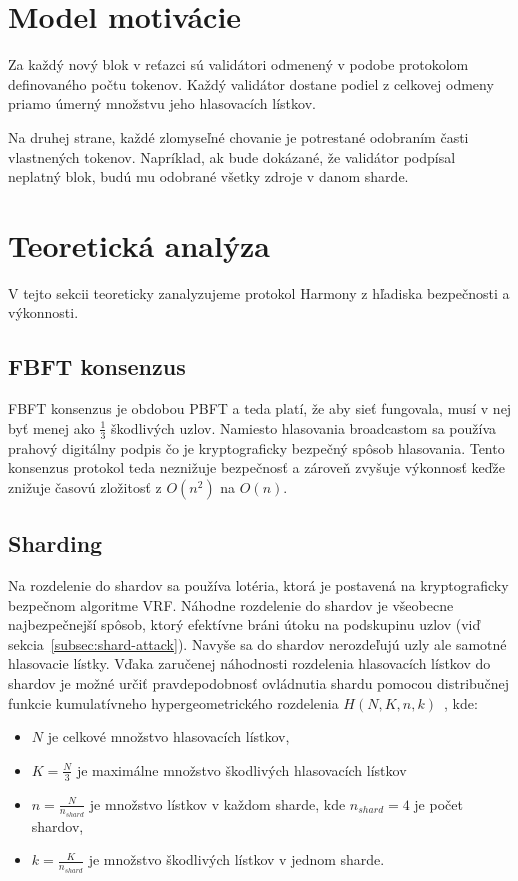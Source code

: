 \section{Model motivácie}

Za každý nový blok v reťazci sú validátori odmenený v podobe protokolom definovaného počtu tokenov. Každý validátor dostane podiel z celkovej odmeny priamo úmerný množstvu jeho hlasovacích lístkov.

Na druhej strane, každé zlomyseľné chovanie je potrestané odobraním časti vlastnených tokenov. Napríklad, ak bude dokázané, že validátor podpísal neplatný blok, budú mu odobrané všetky zdroje v danom sharde.

\section{Teoretická analýza}\label{sec:harmony-analyze}
V tejto sekcii teoreticky zanalyzujeme protokol Harmony z hľadiska bezpečnosti a výkonnosti.

\subsection{FBFT konsenzus}
FBFT konsenzus je obdobou PBFT a teda platí, že aby sieť fungovala, musí v nej byť menej ako $\frac{1}{3}$ škodlivých uzlov. Namiesto hlasovania broadcastom sa používa prahový digitálny podpis čo je kryptograficky bezpečný spôsob hlasovania. Tento konsenzus protokol teda neznižuje bezpečnosť a zároveň zvyšuje výkonnosť keďže znižuje časovú zložitosť z $O(n^2)$ na $O(n)$.

\subsection{Sharding}
Na rozdelenie do shardov sa používa lotéria, ktorá je postavená na kryptograficky bezpečnom algoritme VRF. Náhodne rozdelenie do shardov je všeobecne najbezpečnejší spôsob, ktorý efektívne bráni útoku na podskupinu uzlov (viď sekcia~\ref{subsec:shard-attack}). Navyše sa do shardov nerozdeľujú uzly ale samotné hlasovacie lístky. Vďaka zaručenej náhodnosti rozdelenia hlasovacích lístkov do shardov je možné určiť pravdepodobnosť ovládnutia shardu pomocou distribučnej funkcie kumulatívneho hypergeometrického rozdelenia $H(N,K,n,k)$~\cite{rice2006mathematical, harmonyWp}, kde:
\begin{itemize}
	\item $N$ je celkové množstvo hlasovacích lístkov,
	\item $K = \frac{N}{3}$ je maximálne množstvo škodlivých hlasovacích lístkov
	\item $n = \frac{N}{n_{shard}}$ je množstvo lístkov v každom sharde, kde $n_{shard} = 4$ je počet shardov,
	\item $k = \frac{K}{n_{shard}}$ je množstvo škodlivých lístkov v jednom sharde.
\end{itemize}

